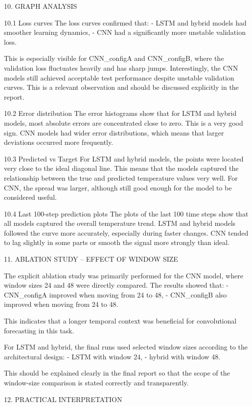 10. GRAPH ANALYSIS

10.1 Loss curves
The loss curves confirmed that:
- LSTM and hybrid models had smoother learning dynamics,
- CNN had a significantly more unstable validation loss.

This is especially visible for CNN_configA and CNN_configB, where the validation loss fluctuates heavily and has sharp jumps. Interestingly, the CNN models still achieved acceptable test performance despite unstable validation curves. This is a relevant observation and should be discussed explicitly in the report.

10.2 Error distribution
The error histograms show that for LSTM and hybrid models, most absolute errors are concentrated close to zero. This is a very good sign. CNN models had wider error distributions, which means that larger deviations occurred more frequently.

10.3 Predicted vs Target
For LSTM and hybrid models, the points were located very close to the ideal diagonal line. This means that the models captured the relationship between the true and predicted temperature values very well. For CNN, the spread was larger, although still good enough for the model to be considered useful.

10.4 Last 100-step prediction plots
The plots of the last 100 time steps show that all models captured the overall temperature trend. LSTM and hybrid models followed the curve more accurately, especially during faster changes. CNN tended to lag slightly in some parts or smooth the signal more strongly than ideal.

11. ABLATION STUDY – EFFECT OF WINDOW SIZE

The explicit ablation study was primarily performed for the CNN model, where window sizes 24 and 48 were directly compared. The results showed that:
- CNN_configA improved when moving from 24 to 48,
- CNN_configB also improved when moving from 24 to 48.

This indicates that a longer temporal context was beneficial for convolutional forecasting in this task.

For LSTM and hybrid, the final runs used selected window sizes according to the architectural design:
- LSTM with window 24,
- hybrid with window 48.

This should be explained clearly in the final report so that the scope of the window-size comparison is stated correctly and transparently.

12. PRACTICAL INTERPRETATION

